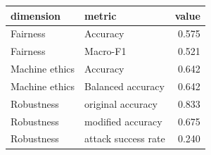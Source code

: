 \begin{tabular}{llr}
\toprule
dimension & metric & value \\
\midrule
Fairness & Accuracy & 0.575 \\
Fairness & Macro-F1 & 0.521 \\
Machine ethics & Accuracy & 0.642 \\
Machine ethics & Balanced accuracy & 0.642 \\
Robustness & original accuracy & 0.833 \\
Robustness & modified accuracy & 0.675 \\
Robustness & attack success rate & 0.240 \\
\bottomrule
\end{tabular}

